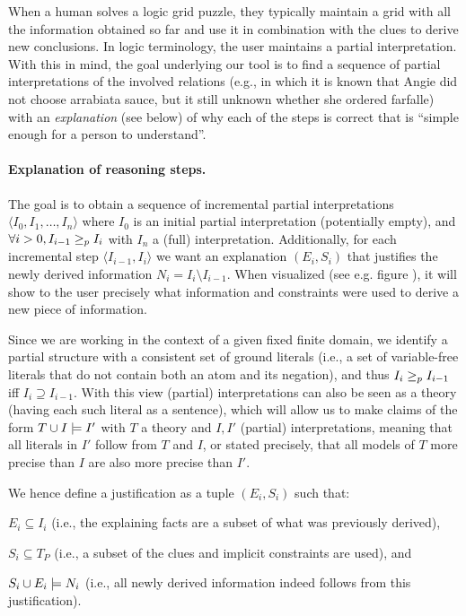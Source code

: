 
When a human solves a logic grid puzzle, they typically maintain a grid with all the information obtained so far and use it in combination with the clues to derive new conclusions. In logic terminology, the user maintains a partial interpretation.  
With this in mind, the goal underlying our tool is to find a sequence of partial interpretations of the involved relations (e.g., in which it is known that Angie did not choose arrabiata sauce, but it still unknown whether she ordered farfalle) with an 
\emph{explanation} (see below) of why each of the steps is correct that is ``simple enough for a person to understand''. 

\paragraph{Explanation of reasoning steps.}
The goal is to obtain a sequence of incremental partial interpretations $\langle I_0, I_1, \ldots, I_n \rangle$ where $I_0$ is an initial partial interpretation (potentially empty), and $\forall i>0, I_{i-1} \geq_p I_{i}$ with $I_n$ a (full) interpretation.
Additionally, for each incremental step $\langle I_{i-1}, I_i \rangle$ we want an explanation $(E_i,S_i)$ that justifies the newly derived information $N_i = I_i \setminus I_{i-1}$. When visualized (see e.g. figure ), it will show to the user precisely what information and constraints were used to derive a new piece of information.

Since we are working in the context of a given fixed finite domain, we identify a partial structure with a consistent set of ground literals (i.e., a set of variable-free literals that do not contain both an atom and its negation), and thus $I_i\geq_p I_{i-1}$ iff $I_i\supseteq I_{i-1}$.
With this view (partial) interpretations can also be seen as a theory (having each such literal as a sentence), which will allow us to make claims of the form 
$T\cup I \models I'$ with $T$ a theory and  $I,I'$ (partial) interpretations, meaning that all literals in $I'$ follow from $T$ and $I$, or stated precisely, that all models of $T$ more precise than $I$ are also more precise than $I'$. 

We hence define a justification as a tuple $(E_i,S_i)$ such that: 
\begin{compactitem}
	\item $E_i\subseteq I_i$ (i.e., the explaining facts are a subset of what was previously derived),
	\item $S_i \subseteq T_P$ (i.e., a subset of the clues and implicit constraints are used), and 
	\item $S_i \cup E_i \models N_i$ (i.e., all newly derived information indeed follows from this justification).
\end{compactitem}

